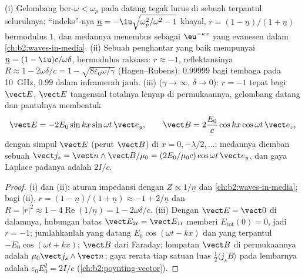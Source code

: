 \begin{proposition}\label{prop:b2:wave-interfaces:conductors}
(i) Gelombang ber-$\omega < \omega_p$ pada datang tegak lurus di sebuah  terpantul
seluruhnya: ``indeks''-nya $\underline n = -\iu\sqrt{\omega_p^2/\omega^2 - 1}$ khayal,
$r = (1 - \underline n)/(1 + \underline n)$ bermodulus $1$, dan medannya menembus
sebagai $\eu^{-\kappa x}$ yang evanesen dalam \cref{ch:b2:waves-in-media}. (ii) Sebuah
penghantar yang baik mempunyai $\underline n = (1 - \iu)c/\omega\delta$, bermodulus raksasa: $r \approx
-1$, reflektansinya $R \approx 1 - 2\omega\delta/c = 1 - \sqrt{8\varepsilon_0\omega/\gamma}$
(Hagen--Rubens): $0.99999$ bagi tembaga pada \qty{10}{GHz}, $0.99$ dalam inframerah
jauh. (iii) \emph{} ($\gamma \to \infty$, $\delta \to 0$):
$r = -1$ tepat bagi $\vect E$, $\vect E$ tangensial totalnya lenyap di
permukaannya, gelombang datang dan pantulnya membentuk 
\[
\vect E = -2E_0\sin kx\sin\omega t\,\vect e_y , \qquad
\vect B = 2\frac{E_0}c\cos kx\cos\omega t\,\vect e_z ,
\]
dengan simpul $\vect E$ (perut $\vect B$) di $x = 0, -\lambda/2, \dots$;
medannya diemban sebuah \emph{} $\vect j_s = \vect n\wedge\vect B/
\mu_0 = (2E_0/\mu_0c)\cos\omega t\,\vect e_y$, dan gaya Laplace padanya adalah
 $2I/c$.
\end{proposition}

\begin{proof}
(i) dan (ii): aturan impedansi dengan $Z \propto 1/\underline n$ dan  \cref{ch:b2:waves-in-media}; bagi (ii), $r = (1 - \underline n)/(1 +
\underline n) \approx -1 + 2/\underline n$ dan $R = |r|^2 \approx 1 - 4\operatorname{Re}(1/
\underline n) = 1 - 2\omega\delta/c$. (iii) Dengan $\vect E = \vect 0$ di dalamnya,
hubungan batas $\vect E_{2t} = \vect E_{1t}$ memberi $E_{\text{tot}}(0) = 0$, jadi $r =
-1$; jumlahkanlah yang datang $E_0\cos(\omega t - kx)$ dan yang terpantul $-E_0\cos(\omega t + kx)$;
$\vect B$ dari Faraday; lompatan $\vect B$ di permukaannya adalah $\mu_0\vect j_s
\wedge\vect n$; gaya rerata tiap satuan luas $\tfrac12\langle j_sB\rangle$ pada
lembarnya adalah $\varepsilon_0E_0^2 = 2I/c$ (\cref{ch:b2:poynting-vector}).
\end{proof}

